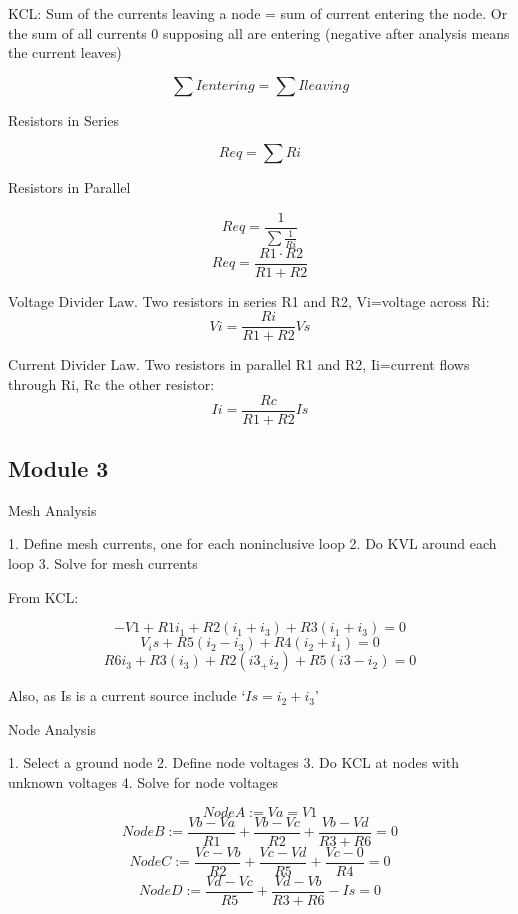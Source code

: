 \documentclass[]{article}
\begin{document}
KCL: Sum of the currents leaving a node = sum of current entering the node. Or the sum of all currents 0 supposing all are entering (negative after analysis means the current leaves)

$$\sum Ientering = \sum Ileaving$$

Resistors in Series

$$Req=\sum Ri$$

Resistors in Parallel

$$Req=\frac{1}{\sum\frac{1}{Ri}}$$
$$Req=\frac{R1\cdot R2}{R1+R2}$$

Voltage Divider Law. 
Two resistors in series R1 and R2, Vi=voltage across Ri:
$$Vi=\frac{Ri}{R1+R2}Vs$$

Current Divider Law. 
Two resistors in parallel R1 and R2, Ii=current flows through Ri, Rc the other resistor:
$$Ii=\frac{Rc}{R1+R2}Is$$
\subsection{Module 3}
Mesh Analysis

1. Define mesh currents, one for each noninclusive
loop
2. Do KVL around each loop
3. Solve for mesh currents


From KCL:

$$-V1+R1i_1 +R2(i_1+i_3)+R3(i_1+i_3)=0$$
$$V_is+R5(i_2-i_3)+R4(i_2+i_1)=0$$
$$R6i_3+R3(i_3)+R2(i3_+i_2)+R5(i3-i_2)=0$$

Also, as Is is a current source include `$Is=i_2+i_3$'

\newpage
Node Analysis

1. Select a ground node
2. Define node voltages
3. Do KCL at nodes with unknown voltages
4. Solve for node voltages

$$Node A := Va=V1$$
$$Node B := \frac{Vb-Va}{R1}+\frac{Vb-Vc}{R2} +\frac{Vb-Vd}{R3+R6}=0$$
$$Node C := \frac{Vc-Vb}{R2}+\frac{Vc-Vd}{R5} +\frac{Vc-0}{R4}=0$$
$$Node D := \frac{Vd-Vc}{R5}+\frac{Vd-Vb}{R3+R6} -Is=0$$
\end{document}
